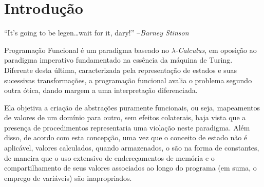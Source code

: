 \documentclass[brazil,times]{abnt}
\begin{document}





\data{\today}

\capa
\folhaderosto

\tableofcontents

\chapter*{Introdução}
``{\small It's going to be legen\ldots wait for it, dary!'' \hfill --\emph{Barney Stinson}}

Programação Funcional é um paradigma baseado no $\lambda$-\textit{Calculus}, em oposição ao paradigma imperativo fundamentado na essência da máquina de Turing. Diferente desta última, caracterizada pela representação de estados e suas sucessivas transformações, a programação funcional avalia o problema segundo outra ótica, dando margem a uma interpretação diferenciada.

Ela objetiva a criação de abstrações puramente funcionais, ou seja, mapeamentos de valores de um domínio para outro, sem efeitos colaterais, haja vista que a presença de procedimentos representaria uma violação neste paradigma. Além disso, de acordo com esta concepção, uma vez que o conceito de estado não é aplicável, valores calculados, quando armazenados, o são na forma de constantes, de maneira que o uso extensivo de endereçamentos de memória e o compartilhamento de seus valores associados ao longo do programa (em suma, o emprego de variáveis) são inapropriados.
\end{document}
